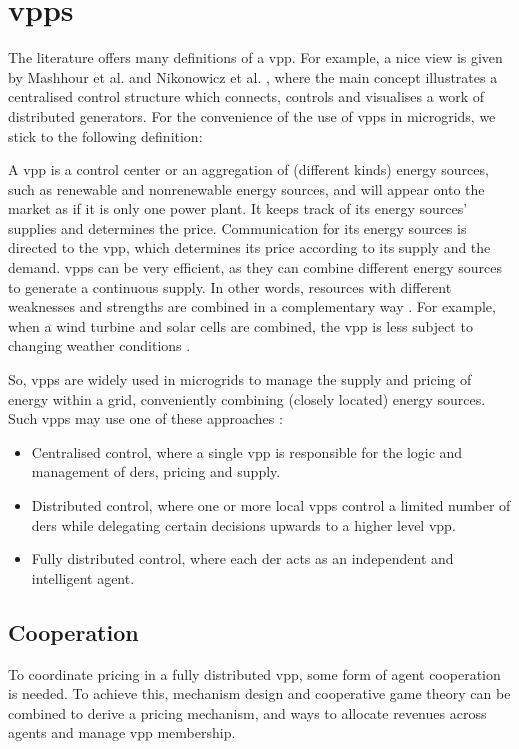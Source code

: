 \section{\aclp{vpp}}\label{vpp}
The literature offers many definitions of a \ac{vpp}. For example, a nice view is given by Mashhour et al. \cite{MashhourMoghaddas-Tafreshi2011} and Nikonowicz et al. \cite{NikonowiczMilewski2012}, where the main concept illustrates a centralised control structure which connects, controls and visualises a work of distributed generators. For the convenience of the use of \acp{vpp} in microgrids, we stick to the following definition:

A \ac{vpp} is a control center or an aggregation of (different kinds) energy sources, such as renewable and nonrenewable energy sources, and will appear onto the market as if it is only one power plant. It keeps track of its energy sources' supplies and determines the price. Communication for its energy sources is directed to the \ac{vpp}, which determines its price according to its supply and the demand. \acp{vpp} can be very efficient, as they can combine different energy sources to generate a continuous supply. In other words, resources with different weaknesses and strengths are combined in a complementary way \cite{Koeppel2003}. For example, when a wind turbine and solar cells are combined, the \ac{vpp} is less subject to changing weather conditions \cite{Tromly2001, Kumagai2012, MashhourMoghaddas-Tafreshi2011, NikonowiczMilewski2012}. 

So, \acp{vpp} are widely used in microgrids to manage the supply and pricing of energy within a grid, conveniently combining (closely located) energy sources. Such \acp{vpp} may use one of these approaches \cite{NikonowiczMilewski2012}:
\begin{itemize}
	\item Centralised control, where a single \ac{vpp} is responsible for the logic and management of \acp{der}, pricing and supply.
	\item Distributed control, where one or more local \acp{vpp} control a limited number of \acp{der} while delegating certain decisions upwards to a higher level \ac{vpp}.
	\item Fully distributed control, where each \ac{der} acts as an independent and intelligent agent.
\end{itemize}

\subsection{Cooperation}
\label{microgrids:cooperation}
To coordinate pricing in a fully distributed \ac{vpp}, some form of agent cooperation is needed. To achieve this, mechanism design and cooperative game theory can be combined to derive a pricing mechanism, and ways to allocate revenues across agents and manage \ac{vpp} membership\cite{ChalkiadakisRobuKotaEtAl2011}. 

